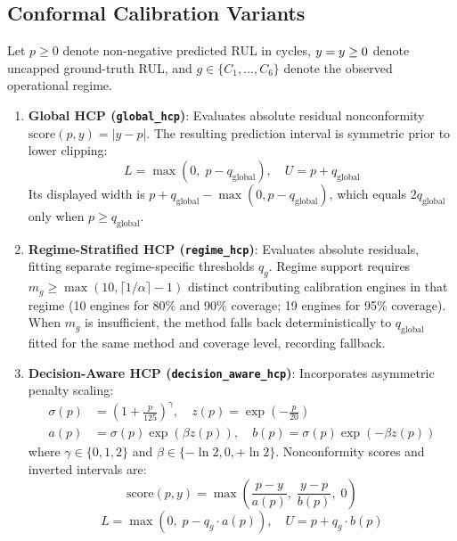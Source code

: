 \subsection{Conformal Calibration Variants}
Let $p \ge 0$ denote non-negative predicted RUL in cycles, $y = y \ge 0$ denote uncapped ground-truth RUL, and $g \in \{C_1, \dots, C_6\}$ denote the observed operational regime.
\begin{enumerate}
    \item \textbf{Global HCP (\texttt{global\_hcp})}: Evaluates absolute residual nonconformity $\text{score}(p, y) = |y - p|$. The resulting prediction interval is symmetric prior to lower clipping:
    \begin{equation}
    L = \max(0, \; p - q_{\text{global}}), \quad U = p + q_{\text{global}}
    \end{equation}
    Its displayed width is $p + q_{\text{global}} - \max(0, p - q_{\text{global}})$, which equals $2q_{\text{global}}$ only when $p \ge q_{\text{global}}$.

    \item \textbf{Regime-Stratified HCP (\texttt{regime\_hcp})}: Evaluates absolute residuals, fitting separate regime-specific thresholds $q_g$. Regime support requires $m_g \ge \max(10, \lceil 1/\alpha \rceil - 1)$ distinct contributing calibration engines in that regime (10 engines for 80\% and 90\% coverage; 19 engines for 95\% coverage). When $m_g$ is insufficient, the method falls back deterministically to $q_{\text{global}}$ fitted for the same method and coverage level, recording fallback.

    \item \textbf{Decision-Aware HCP (\texttt{decision\_aware\_hcp})}: Incorporates asymmetric penalty scaling:
    \begin{align}
    \sigma(p) &= \left(1 + \frac{p}{125}\right)^\gamma, \quad z(p) = \exp\left(-\frac{p}{20}\right) \\
    a(p) &= \sigma(p)\exp(\beta z(p)), \quad b(p) = \sigma(p)\exp(-\beta z(p))
    \end{align}
    where $\gamma \in \{0, 1, 2\}$ and $\beta \in \{-\ln 2, 0, +\ln 2\}$. Nonconformity scores and inverted intervals are:
    \begin{equation}
    \text{score}(p, y) = \max\left(\frac{p - y}{a(p)}, \; \frac{y - p}{b(p)}, \; 0\right)
    \end{equation}
    \begin{equation}
    L = \max(0, \; p - q_g \cdot a(p)), \quad U = p + q_g \cdot b(p)
    \end{equation}
\end{enumerate}

